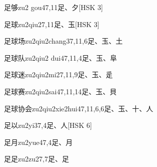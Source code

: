 \begin{EntryWithPhonetic}{足够}{zu2 gou4}{7,11}{⾜、⼣}[HSK 3]
\end{EntryWithPhonetic}

\begin{EntryWithPhonetic}{足球}{zu2qiu2}{7,11}{⾜、⽟}[HSK 3]
\end{EntryWithPhonetic}

\begin{EntryWithPhonetic}{足球场}{zu2qiu2chang3}{7,11,6}{⾜、⽟、⼟}
\end{EntryWithPhonetic}

\begin{EntryWithPhonetic}{足球队}{zu2qiu2 dui4}{7,11,4}{⾜、⽟、⾩}
\end{EntryWithPhonetic}

\begin{EntryWithPhonetic}{足球迷}{zu2qiu2mi2}{7,11,9}{⾜、⽟、⾡}
\end{EntryWithPhonetic}

\begin{EntryWithPhonetic}{足球赛}{zu2qiu2sai4}{7,11,14}{⾜、⽟、⾙}
\end{EntryWithPhonetic}

\begin{EntryWithPhonetic}{足球协会}{zu2qiu2xie2hui4}{7,11,6,6}{⾜、⽟、⼗、⼈}
\end{EntryWithPhonetic}

\begin{EntryWithPhonetic}{足以}{zu2yi3}{7,4}{⾜、⼈}[HSK 6]
\end{EntryWithPhonetic}

\begin{EntryWithPhonetic}{足月}{zu2yue4}{7,4}{⾜、⽉}
\end{EntryWithPhonetic}

\begin{EntryWithPhonetic}{足足}{zu2zu2}{7,7}{⾜、⾜}
\end{EntryWithPhonetic}

